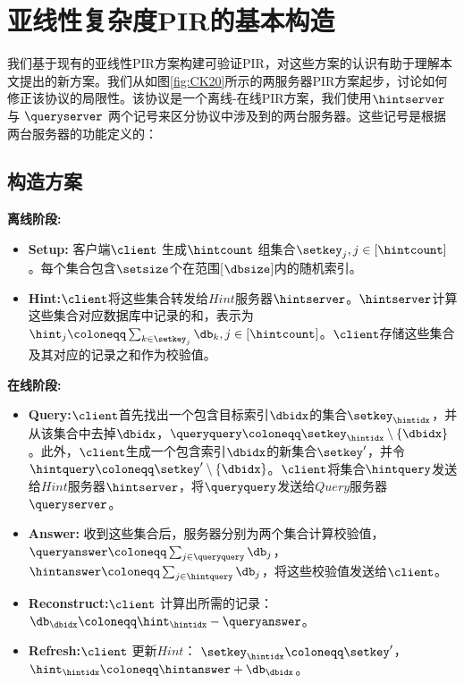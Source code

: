 \section{亚线性复杂度PIR的基本构造}
我们基于现有的亚线性PIR方案\cite{EC:CorKog20, C:LazPap23}构建可验证PIR，对这些方案的认识有助于理解本文提出的新方案。我们从如图\ref{fig:CK20}所示的两服务器PIR方案起步，讨论如何修正该协议的局限性。该协议是一个离线-在线PIR方案，我们使用$\hintserver$ 与 $\queryserver$ 两个记号来区分协议中涉及到的两台服务器。这些记号是根据两台服务器的功能定义的：

\subsection{构造方案}

\noindent \textbf{离线阶段:}
\begin{itemize}
\item \textbf{Setup:} 客户端$\client$ 生成$\hintcount$ 组集合$\setkey_j, j\in[\hintcount]$。每个集合包含$\setsize$个在范围[$\dbsize$]内的随机索引。
\item \textbf{Hint:}$\client$将这些集合转发给$Hint$服务器$\hintserver$。$\hintserver$计算这些集合对应数据库中记录的和，表示为$\hint_j \coloneqq \sum_{k\in \setkey_j} \db_k, j \in [\hintcount]$。$\client$存储这些集合及其对应的记录之和作为校验值。
\end{itemize}

\noindent \textbf{在线阶段:}
\begin{itemize}
\item \textbf{Query:}$\client$首先找出一个包含目标索引$\dbidx$的集合$\setkey_\hintidx$，并从该集合中去掉$\dbidx$，$\queryquery \coloneqq \setkey_\hintidx \setminus \{\dbidx\}$。此外，$\client$生成一个包含索引$\dbidx$的新集合$\setkey'$，并令$\hintquery \coloneqq \setkey' \setminus \{\dbidx\}$。$\client$将集合$\hintquery$发送给$Hint$服务器$\hintserver$，将$\queryquery$发送给$Query$服务器$\queryserver$。
\item \textbf{Answer:} 收到这些集合后，服务器分别为两个集合计算校验值，$\queryanswer\coloneqq \sum_{j\in \queryquery}\db_j$，$\hintanswer\coloneqq \sum_{j\in \hintquery}\db_j$，将这些校验值发送给$\client$。
\item \textbf{Reconstruct:}$\client$ 计算出所需的记录：$\db_\dbidx \coloneqq \hint_\hintidx - \queryanswer$。
\item \textbf{Refresh:}$\client$ 更新$Hint$： $\setkey_\hintidx \coloneqq \setkey'$，$\hint_\hintidx \coloneqq \hintanswer+\db_\dbidx$。
\end{itemize}


